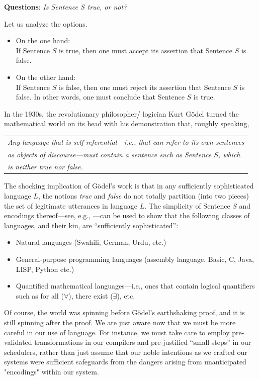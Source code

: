 \noindent
{\bf Questions}: {\it Is Sentence $S$ true, or not?}

\noindent
Let us analyze the options.
\begin{itemize}
\item
On the one hand: \\
If Sentence $S$ is true, then one must accept its assertion that
Sentence $S$ is false.

\item
On the other hand: \\
If Sentence $S$ is false, then one must reject its assertion that
Sentence $S$ is false.  In other words, one must conclude that
Sentence $S$ is true.
\end{itemize}

\noindent
In the 1930s, the revolutionary philosopher/ logician Kurt G\"{o}del
 turned the mathematical world on its head with
his demonstration that, roughly speaking,

\begin{tabular}{l}
{\em Any language that is self-referential---i.e., that can refer to
  its own sentences} \\
{\em as objects of discourse---must contain a sentence such as
  Sentence $S$, which} \\
{\em is neither true nor false.}  \cite{Goedel31}
\end{tabular}

The shocking implication of G\"{o}del's work is that in any
sufficiently sophisticated language $L$, the notions {\it true} and
{\it false} do not totally partition (into two pieces) the set of
legitimate utterances in language $L$.  The simplicity of Sentence $S$
and encodings thereof---see, e.g., \cite{Rosenberg09}---can be used to
show that the following classes of languages, and their kin, are
``sufficiently sophisticated'':
\begin{itemize}
\item
Natural languages (Swahili, German, Urdu, etc.)
\item
General-purpose programming languages (assembly language, Basic, C,
Java, LISP, Python etc.)
\item
Quantified mathematical languages---i.e., ones that contain logical
quantifiers such as {\sc for all} ($\forall$), {\sc there exist}
($\exists$), etc.
\end{itemize}

Of course, the world was spinning before G\"{o}del's earthshaking
proof, and it is still spinning after the proof.  We are just aware
now that we must be more careful in our use of language.  For
instance, we must take care to employ pre-validated transformations in
our compilers and pre-justified ``small steps'' in our schedulers,
rather than just assume that our noble intentions as we crafted our
systems were sufficient safeguards from the dangers arising from
unanticipated "encodings" within our system.


